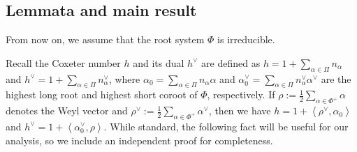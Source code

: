 \documentclass[11pt,twoside]{amsart}
\theoremstyle{plain}
\begin{document}
\subsection{Lemmata and main result}
From now on, we assume that the root system $\Phi$ is irreducible.

Recall the Coxeter number $h$ and its dual $h^\vee$ are defined as $h=1+\sum_{\alpha\in\Pi}n_\alpha$ and $h^\vee=1+\sum_{\alpha\in\Pi}n_\alpha^\vee$, where $\alpha_0=\sum_{\alpha\in\Pi}n_\alpha\alpha$ and $\alpha_0^\vee=\sum_{\alpha\in\Pi}n_\alpha^\vee\alpha^\vee$ are the highest long root and highest short coroot of $\Phi$, respectively. If $\rho:=\tfrac12\sum_{\alpha\in\Phi^+}\alpha$ denotes the Weyl vector and $\rho^\vee:=\tfrac12\sum_{\alpha\in\Phi^+}\alpha^\vee$, then we have $h=1+\left<\rho^\vee,\alpha_0\right>$ and $h^\vee=1+\left<\alpha_0^\vee,\rho\right>$. While standard, the following fact will be useful for our analysis, so we include an independent proof for completeness.
\end{document}
